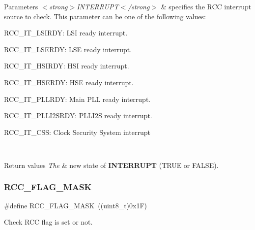 \begin{DoxyParams}{Parameters}
{\em $<$strong$>$\+I\+N\+T\+E\+R\+R\+U\+P\+T$<$/strong$>$} & specifies the R\+CC interrupt source to check. This parameter can be one of the following values\+: \begin{DoxyItemize}
\item R\+C\+C\+\_\+\+I\+T\+\_\+\+L\+S\+I\+R\+DY\+: L\+SI ready interrupt. \item R\+C\+C\+\_\+\+I\+T\+\_\+\+L\+S\+E\+R\+DY\+: L\+SE ready interrupt. \item R\+C\+C\+\_\+\+I\+T\+\_\+\+H\+S\+I\+R\+DY\+: H\+SI ready interrupt. \item R\+C\+C\+\_\+\+I\+T\+\_\+\+H\+S\+E\+R\+DY\+: H\+SE ready interrupt. \item R\+C\+C\+\_\+\+I\+T\+\_\+\+P\+L\+L\+R\+DY\+: Main P\+LL ready interrupt. \item R\+C\+C\+\_\+\+I\+T\+\_\+\+P\+L\+L\+I2\+S\+R\+DY\+: P\+L\+L\+I2S ready interrupt. \item R\+C\+C\+\_\+\+I\+T\+\_\+\+C\+SS\+: Clock Security System interrupt \end{DoxyItemize}
\\
\hline
\end{DoxyParams}

\begin{DoxyRetVals}{Return values}
{\em The} & new state of {\bfseries{I\+N\+T\+E\+R\+R\+U\+PT}} (T\+R\+UE or F\+A\+L\+SE). \\
\hline
\end{DoxyRetVals}
\mbox{\label{group___r_c_c___flags___interrupts___management_ga80017c6bf8a5c6f53a1a21bb8db93a82}} 
\subsubsection{\texorpdfstring{RCC\_FLAG\_MASK}{RCC\_FLAG\_MASK}}
{\footnotesize\ttfamily \#define R\+C\+C\+\_\+\+F\+L\+A\+G\+\_\+\+M\+A\+SK~((uint8\+\_\+t)0x1\+F)}



Check R\+CC flag is set or not. 


